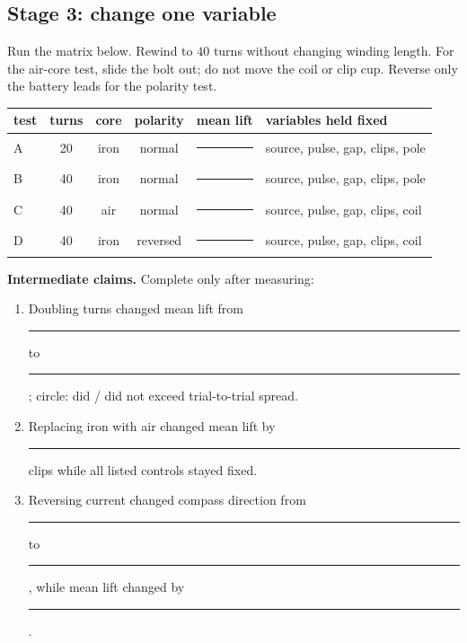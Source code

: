 {\subsection*{Stage 3: change one variable}
Run the matrix below. Rewind to \(40\) turns without changing winding length. For the air-core test, slide the bolt out; do not move the coil or clip cup. Reverse only the battery leads for the polarity test.
\begin{center}\small
\begin{tabularx}{\linewidth}{@{}lccccX@{}}\toprule
test & turns & core & polarity & mean lift & variables held fixed\\\midrule
A & 20 & iron & normal & \rule{12mm}{.4pt} & source, pulse, gap, clips, pole\\
B & 40 & iron & normal & \rule{12mm}{.4pt} & source, pulse, gap, clips, pole\\
C & 40 & air & normal & \rule{12mm}{.4pt} & source, pulse, gap, clips, coil\\
D & 40 & iron & reversed & \rule{12mm}{.4pt} & source, pulse, gap, clips, coil\\
\bottomrule\end{tabularx}
\end{center}
\polaritysketch
\noindent\textbf{Intermediate claims.} Complete only after measuring:
\begin{enumerate}[label=\alph*.,leftmargin=*]
\item Doubling turns changed mean lift from \rule{10mm}{.4pt} to \rule{10mm}{.4pt}; circle: did / did not exceed trial-to-trial spread.
\item Replacing iron with air changed mean lift by \rule{10mm}{.4pt} clips while all listed controls stayed fixed.
\item Reversing current changed compass direction from \rule{14mm}{.4pt} to \rule{14mm}{.4pt}, while mean lift changed by \rule{10mm}{.4pt}.
\end{enumerate}

}
